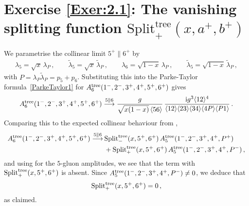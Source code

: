 \section*{Exercise \ref{Exer:2.1}: The vanishing splitting function $\mathrm{Split}^{\mathrm{tree}}_+(x,a^+,b^+)$}
\label{Sol:2.1}
We parametrise the collinear limit $5^+ \parallel 6^+$ by
\begin{align}
\lambda_5 = \sqrt{x} \, \lambda_P \,, \qquad \tilde{\lambda}_5 = \sqrt{x} \, \tilde{\lambda}_P \,, \qquad 
\lambda_6 = \sqrt{1-x} \, \lambda_P \,, \qquad \tilde{\lambda}_5 = \sqrt{1-x} \, \tilde{\lambda}_P \,,
\end{align} 
with $P = \lambda_P \tilde{\lambda}_P = p_5 + p_6$. Substituting this into the Parke-Taylor formula~\eqref{ParkeTaylor1} for $A_{6}^{\rm tree}(1^{-}, 2^{-}, 3^{+}, 4^{+}, 5^{+}, 6^{+})$ gives
\begin{align}
A_{6}^{\rm tree}(1^{-}, 2^{-}, 3^{+}, 4^{+}, 5^{+}, 6^{+}) \stackrel{5 \parallel 6}{\longrightarrow} \frac{g}{\sqrt{x(1-x)}\,\langle56\rangle}\, \frac{\mathrm{i} g^3 \langle12\rangle^{4}}{\langle12\rangle\langle23\rangle\langle34\rangle\langle4P\rangle\langle P1\rangle} \,.
\end{align}
Comparing this to the expected collinear behaviour from ,
\begin{align} \begin{aligned}
A_{6}^{\rm tree}(1^{-}, 2^{-}, 3^{+}, 4^{+}, 5^{+}, 6^{+}) \stackrel{5 \parallel 6}{\longrightarrow} \, & {\rm Split}_{-}^{\rm tree}(x,5^{+},6^{+})\, 
A_{5}^{\rm tree}(1^{-}, 2^{-}, 3^{+}, 4^{+}, P^{+}) \\ 
& + {\rm Split}_{+}^{\rm tree}(x,5^{+},6^{+}) \, A_{5}^{\rm tree}(1^{-}, 2^{-}, 3^{+}, 4^{+}, P^{-}) \,, 
\end{aligned} \end{align}
and using  for the $5$-gluon amplitudes, we see that the term with ${\rm Split}_{+}^{\rm tree}(x,5^{+},6^{+})$ is absent. Since $ A_{5}^{\rm tree}(1^{-}, 2^{-}, 3^{+}, 4^{+}, P^{-}) \neq 0$, we deduce that
\begin{align}
{\rm Split}_{+}^{\rm tree}(x,5^{+},6^{+}) = 0 \,,
\end{align} 
as claimed.


